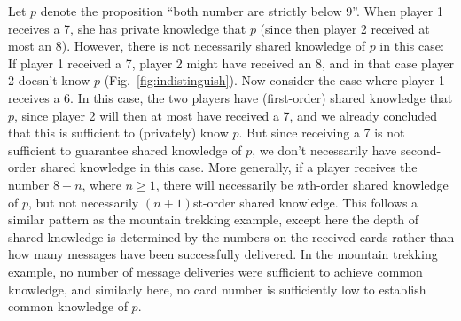Let $p$ denote the proposition ``both number are strictly below 9''. When player 1 receives a 7, she has private knowledge that $p$ (since then player 2 received at most an 8). However, there is not necessarily shared knowledge of $p$ in this case: If player 1 received a 7, player 2 might have received an 8, and in that case player 2 doesn't know $p$ (Fig.~\ref{fig:indistinguish}). Now consider the case where player 1 receives a 6. In this case, the two players have (first-order) shared knowledge that $p$, since player 2 will then at most have received a 7, and we already concluded that this is sufficient to (privately) know $p$. But since receiving a 7 is not sufficient to guarantee shared knowledge of $p$, we don't necessarily have second-order shared knowledge in this case. More generally, if a player receives the number $8-n$, where $n\geq 1$, there will necessarily be $n$th-order shared knowledge of $p$, but not necessarily $(n+1)$st-order shared knowledge. This follows a similar pattern as the mountain trekking example, except here the depth of shared knowledge is determined by the numbers on the received cards rather than how many messages have been successfully delivered. In the mountain trekking example, no number of message deliveries were suﬀicient to achieve common knowledge, and similarly here, no card number is
suﬀiciently low to establish common knowledge of $p$. 



